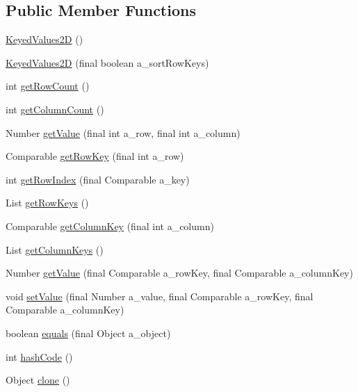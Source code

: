 \subsection*{Public Member Functions}
\begin{DoxyCompactItemize}
\item 
\hyperlink{classorg_1_1jgap_1_1audit_1_1_keyed_values2_d_a983cb4297273b51cef73b7455beb4649}{Keyed\-Values2\-D} ()
\item 
\hyperlink{classorg_1_1jgap_1_1audit_1_1_keyed_values2_d_a5b8b98c764c10f0c73285deb5b45aea1}{Keyed\-Values2\-D} (final boolean a\-\_\-sort\-Row\-Keys)
\item 
int \hyperlink{classorg_1_1jgap_1_1audit_1_1_keyed_values2_d_a4bf952dfa3dd025812a07aec24e0c98d}{get\-Row\-Count} ()
\item 
int \hyperlink{classorg_1_1jgap_1_1audit_1_1_keyed_values2_d_a959d1f3fe01e093e9bf19b555db04a20}{get\-Column\-Count} ()
\item 
Number \hyperlink{classorg_1_1jgap_1_1audit_1_1_keyed_values2_d_a3571b9adfab009b7fb23f994adc02702}{get\-Value} (final int a\-\_\-row, final int a\-\_\-column)
\item 
Comparable \hyperlink{classorg_1_1jgap_1_1audit_1_1_keyed_values2_d_a3f28a331e3fbe0f8b345d7f1da62b2e2}{get\-Row\-Key} (final int a\-\_\-row)
\item 
int \hyperlink{classorg_1_1jgap_1_1audit_1_1_keyed_values2_d_a7f213441a2246798d2ed1c800389863c}{get\-Row\-Index} (final Comparable a\-\_\-key)
\item 
List \hyperlink{classorg_1_1jgap_1_1audit_1_1_keyed_values2_d_abee6e7883c08e99791585dae0e05756f}{get\-Row\-Keys} ()
\item 
Comparable \hyperlink{classorg_1_1jgap_1_1audit_1_1_keyed_values2_d_a6ff2b29ee889c000dd78aa641dd6a26d}{get\-Column\-Key} (final int a\-\_\-column)
\item 
List \hyperlink{classorg_1_1jgap_1_1audit_1_1_keyed_values2_d_a895abe15c8057bfaf4164439744df403}{get\-Column\-Keys} ()
\item 
Number \hyperlink{classorg_1_1jgap_1_1audit_1_1_keyed_values2_d_a71eff0997c8a321e91f0ac7c1ffb90e2}{get\-Value} (final Comparable a\-\_\-row\-Key, final Comparable a\-\_\-column\-Key)
\item 
void \hyperlink{classorg_1_1jgap_1_1audit_1_1_keyed_values2_d_a4e88da337b24f20f60f0d89b463c46d2}{set\-Value} (final Number a\-\_\-value, final Comparable a\-\_\-row\-Key, final Comparable a\-\_\-column\-Key)
\item 
boolean \hyperlink{classorg_1_1jgap_1_1audit_1_1_keyed_values2_d_a659d511c9d762eb12971001366c29086}{equals} (final Object a\-\_\-object)
\item 
int \hyperlink{classorg_1_1jgap_1_1audit_1_1_keyed_values2_d_a4f10a3b05c79f77c2101151db01ce393}{hash\-Code} ()
\item 
Object \hyperlink{classorg_1_1jgap_1_1audit_1_1_keyed_values2_d_a810f40d0731ff7a3eba73080af580008}{clone} ()
\end{DoxyCompactItemize}
